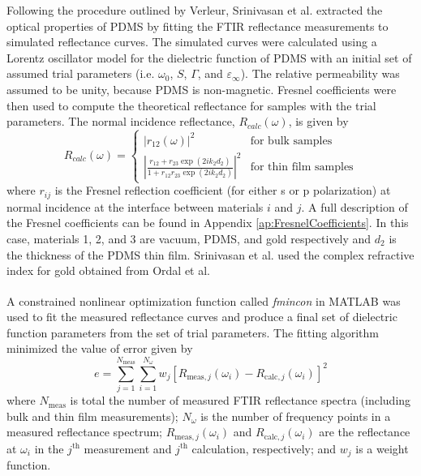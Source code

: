 Following the procedure outlined by Verleur,\cite{Verleur1968} Srinivasan et al. extracted the optical properties of PDMS by fitting the FTIR reflectance measurements to simulated reflectance curves. The simulated curves were calculated using a Lorentz oscillator model for the dielectric function of PDMS with an initial set of assumed trial parameters (i.e. $\omega_{0}$, $S$, $\Gamma$, and $\varepsilon_{\infty}$). The relative permeability was assumed to be unity, because PDMS is non-magnetic. Fresnel coefficients were then used to compute the theoretical reflectance for samples with the trial parameters. The normal incidence reflectance, $R_{calc}(\omega)$, is given by
%
\begin{equation}
R_{calc}(\omega) =
\left\{\begin{array}{lll}
\left| r_{12}(\omega) \right|^{2} & \text{for bulk samples} \\
\left| \frac{ r_{12} + r_{23} \exp{\left( 2i k_{2} d_{2} \right)} }{ 1 + r_{12} r_{23} \exp{\left( 2i k_{2} d_{2} \right)} } \right|^{2} & \text{for thin film samples}
\end{array} \right.
\end{equation}
%
where $r_{ij}$ is the Fresnel reflection coefficient (for either s or p polarization) at normal incidence at the interface between materials $i$ and $j$. A full description of the Fresnel coefficients can be found in Appendix \ref{ap:FresnelCoefficients}. In this case, materials 1, 2, and 3 are vacuum, PDMS, and gold respectively and $d_{2}$ is the thickness of the PDMS thin film. Srinivasan et al. used the complex refractive index for gold obtained from Ordal et al.\cite{Ordal1985}

A constrained nonlinear optimization function called \textit{fmincon} in MATLAB\textsuperscript{\textregistered} was used to fit the measured reflectance curves and produce a final set of dielectric function parameters from the set of trial parameters. The fitting algorithm minimized the value of error given by
%
\begin{equation}
\label{eqn:fsse}
e = \sum_{j=1}^{N_{\text{meas}}} \sum_{i=1}^{N_{\omega}} w_{j} \left[ R_{\text{meas},j}(\omega_{i}) - R_{\text{calc},j}(\omega_{i}) \right]^2
\end{equation}
%
where $N_{\mathrm{meas}}$ is total the number of measured FTIR reflectance spectra (including bulk and thin film measurements); $N_{\omega}$ is the number of frequency points in a measured reflectance spectrum;  $R_{\text{meas},j}(\omega_{i})$ and $R_{\text{calc},j}(\omega_{i})$ are the reflectance at $\omega_{i}$ in the $j^{\text{th}}$ measurement and $j^{\text{th}}$ calculation, respectively; and $w_{j}$ is a weight function.

